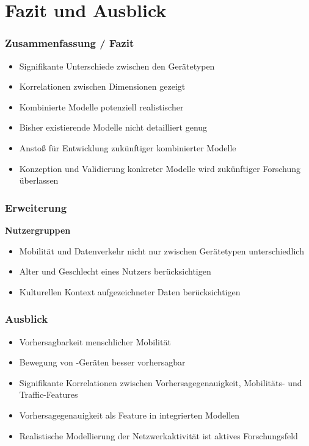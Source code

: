\documentclass{beamer}
\begin{document}
\section{Fazit und Ausblick}

\begin{frame}
  \frametitle{Zusammenfassung / Fazit}
  \begin{itemize}
    \item Signifikante Unterschiede zwischen den Gerätetypen
    \item Korrelationen zwischen Dimensionen gezeigt
    \item Kombinierte Modelle potenziell realistischer
    \item Bisher existierende Modelle nicht detailliert genug
    \item Anstoß für Entwicklung zukünftiger kombinierter Modelle
    \item Konzeption und Validierung konkreter Modelle wird zukünftiger Forschung überlassen
  \end{itemize}  
\end{frame}

\begin{frame}
  \frametitle{Erweiterung}
  \textbf{Nutzergruppen}
  \begin{itemize}
    \item Mobilität und Datenverkehr nicht nur zwischen Gerätetypen unterschiedlich
    \item Alter und Geschlecht eines Nutzers berücksichtigen
    \item Kulturellen Kontext aufgezeichneter Daten berücksichtigen    
  \end{itemize}
\end{frame}

\begin{frame}
  \frametitle{Ausblick}
  \begin{itemize}
    \item Vorhersagbarkeit menschlicher Mobilität
    \item Bewegung von -Geräten besser vorhersagbar
    \item Signifikante Korrelationen zwischen Vorhersagegenauigkeit, Mobilitäts- und Traffic-Features
    \item Vorhersagegenauigkeit als Feature in integrierten Modellen
    \item Realistische Modellierung der Netzwerkaktivität ist aktives Forschungsfeld
  \end{itemize}  
\end{frame}
\end{document}
